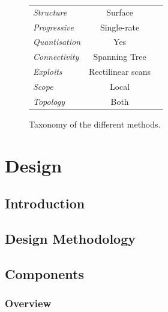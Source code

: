 \documentclass{report}
\begin{document}
\begin{figure}
{\begin{tabular}{||l|c|c||}
  \hline

  \emph{Structure} & Surface & \\

  \emph{Progressive} & Single-rate & \\  

  \emph{Quantisation} & Yes & \\

  \emph{Connectivity} & Spanning Tree & \\

  \emph{Exploits} & Rectilinear scans & \\

  \emph{Scope} & Local & \\

  \emph{Topology} & Both & \\

  \hline
\end{tabular}
}
\caption{Taxonomy of the different methods.}\label{fig:taxonomy}
\end{figure}


\chapter{Design}

\section{Introduction}

\section{Design Methodology}

\section{Components}

\subsection{Overview}



\nocite{*}


\end{document}

